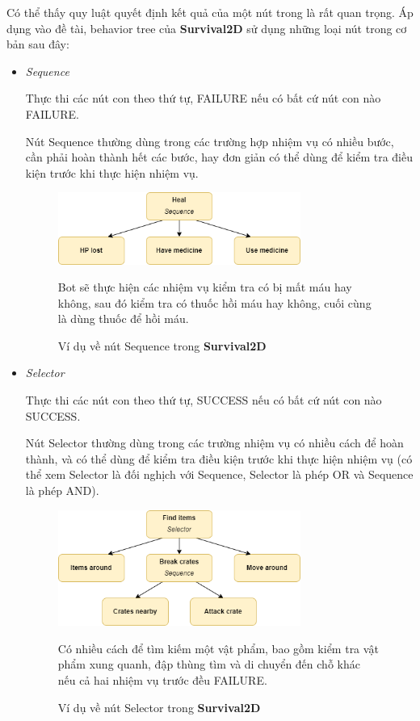 \documentclass[12pt,a4paper]{article}
\begin{document}
  Có thể thấy quy luật quyết định kết quả của một nút trong là rất quan trọng.
  Áp dụng vào đề tài, behavior tree của \textbf{Survival2D} sử dụng những loại nút trong cơ bản sau đây:
  \begin{itemize}
      \item \textit{Sequence}
      
      Thực thi các nút con theo thứ tự, FAILURE nếu có bất cứ nút con nào FAILURE.
      
      Nút Sequence thường dùng trong các trường hợp nhiệm vụ có nhiều bước, cần phải hoàn thành hết các bước, hay đơn giản có thể dùng để kiểm tra điều kiện trước khi thực hiện nhiệm vụ.
      \begin{figure}[H]
          \centering
          \includegraphics[width=0.75\textwidth]{Img/AI/heal.png}
          \caption{Ví dụ về nút Sequence trong \textbf{Survival2D}}
          \label{heal_node}
          Bot sẽ thực hiện các nhiệm vụ kiểm tra có bị mất máu hay không, sau đó kiểm tra có thuốc hồi máu hay không, cuối cùng là dùng thuốc để hồi máu.
      \end{figure}
      \item \textit{Selector}
      
      Thực thi các nút con theo thứ tự, SUCCESS nếu có bất cứ nút con nào SUCCESS.
      
      Nút Selector thường dùng trong các trường nhiệm vụ có nhiều cách để hoàn thành, và có thể dùng để kiểm tra điều kiện trước khi thực hiện nhiệm vụ (có thể xem Selector là đối nghịch với Sequence, Selector là phép OR và Sequence là phép AND).
      \begin{figure}[H]
          \centering
          \includegraphics[width=0.75\textwidth]{Img/AI/find-items.png}
          \caption{Ví dụ về nút Selector trong \textbf{Survival2D}}
          Có nhiều cách để tìm kiếm một vật phẩm, bao gồm kiểm tra vật phẩm xung quanh, đập thùng tìm và di chuyển đến chỗ khác nếu cả hai nhiệm vụ trước đều FAILURE.
      \end{figure}
      

\end{itemize}
\end{document}
